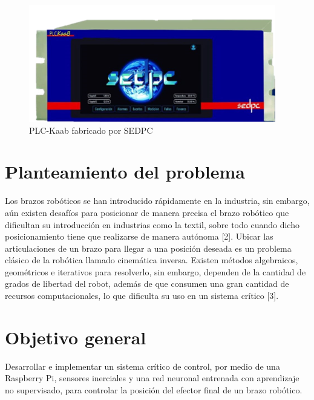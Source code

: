\documentclass[12pt]{report}
\begin{document}
\begin{figure}[htb]
	\centering
	\includegraphics[scale=1]{plckaab.png}
	\caption{PLC-Kaab fabricado por SEDPC}
\end{figure}

\newpage
\section*{Planteamiento del problema}

Los brazos robóticos se han introducido rápidamente en la industria, sin embargo, aún existen desafíos para posicionar de manera precisa el brazo robótico que dificultan su introducción en industrias como la textil, sobre todo cuando dicho posicionamiento tiene que realizarse de manera autónoma [2].
\newline\newline\newline
Ubicar las articulaciones de un brazo para llegar a una posición deseada es un problema clásico de la robótica llamado cinemática inversa. Existen métodos algebraicos, geométricos e iterativos para resolverlo, sin embargo, dependen de la cantidad de grados de libertad del robot, además de que consumen una gran cantidad de recursos computacionales, lo que dificulta su uso en un sistema crítico [3].

\newpage
\section*{Objetivo general}

Desarrollar e implementar un sistema crítico de control, por medio de una Raspberry Pi, sensores inerciales y una red neuronal entrenada con aprendizaje no supervisado, para controlar la posición del efector final de un brazo robótico.

\newpage
\end{document}

